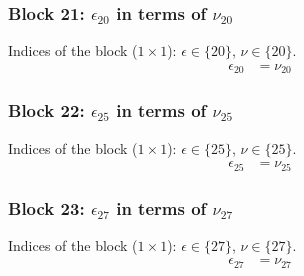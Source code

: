 \subsubsection{Block 21: $\epsilon_{20}$ in terms of $\nu_{20}$}
Indices of the block ($1\times 1$): $\epsilon \in \{20\}$, $\nu \in \{20\}$.
\begin{align*}
\epsilon_{20} &= \nu_{20}
\end{align*}

\subsubsection{Block 22: $\epsilon_{25}$ in terms of $\nu_{25}$}
Indices of the block ($1\times 1$): $\epsilon \in \{25\}$, $\nu \in \{25\}$.
\begin{align*}
\epsilon_{25} &= \nu_{25}
\end{align*}

\subsubsection{Block 23: $\epsilon_{27}$ in terms of $\nu_{27}$}
Indices of the block ($1\times 1$): $\epsilon \in \{27\}$, $\nu \in \{27\}$.
\begin{align*}
\epsilon_{27} &= \nu_{27}
\end{align*}

